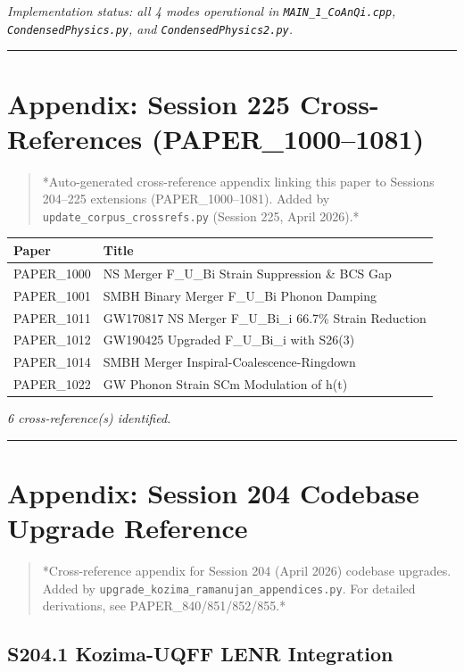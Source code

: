 \documentclass[12pt,a4paper]{article}
\begin{document}
\emph{Implementation status: all 4 modes operational in \texttt{MAIN\_{1\_CoAnQi}.cpp}, \texttt{CondensedPhysics.py}, and \texttt{CondensedPhysics2.py}.}

\medskip\hrule\medskip

\section{Appendix: Session 225 Cross-References (PAPER\_1000--1081)}

\begin{quote}
*Auto-generated cross-reference appendix linking this paper to
Sessions 204--225 extensions (PAPER\_1000--1081). Added by
\texttt{update\_{corpus\_crossrefs}.py} (Session 225, April 2026).*
\end{quote}

\begin{table}[H]
\centering
\small
\begin{tabularx}{\linewidth}{@{}>{\raggedright\arraybackslash}X>{\raggedright\arraybackslash}X@{}}
\toprule
Paper & Title \tabularnewline
\midrule
PAPER\_1000 & NS Merger F\_{U\_Bi} Strain Suppression \& BCS Gap \tabularnewline
PAPER\_1001 & SMBH Binary Merger F\_{U\_Bi} Phonon Damping \tabularnewline
PAPER\_1011 & GW170817 NS Merger F\_{U\_Bi\_i} 66.7\% Strain Reduction \tabularnewline
PAPER\_1012 & GW190425 Upgraded F\_{U\_Bi\_i} with S26(3) \tabularnewline
PAPER\_1014 & SMBH Merger Inspiral-Coalescence-Ringdown \tabularnewline
PAPER\_1022 & GW Phonon Strain SCm Modulation of h(t) \tabularnewline
\bottomrule
\end{tabularx}
\end{table}

\emph{6 cross-reference(s) identified.}

\medskip\hrule\medskip

\section{Appendix: Session 204 Codebase Upgrade Reference}

\begin{quote}
*Cross-reference appendix for Session 204 (April 2026) codebase upgrades.
Added by \texttt{upgrade\_{kozima\_ramanujan\_appendices}.py}. For detailed derivations,
see PAPER\_840/851/852/855.*
\end{quote}

\subsection{S204.1 Kozima-UQFF LENR Integration}
\end{document}
